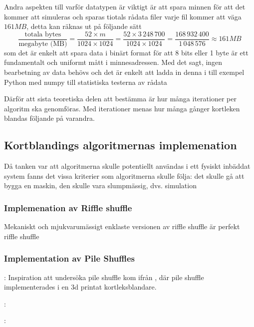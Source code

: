 \documentclass[swedish,a4paper]{article}
\begin{document}
Andra aspekten till varför datatypen är viktigt är att spara minnen för att det
kommer att simuleras och sparas tiotals rådata filer varje fil kommer att väga
$161 MB$,
detta kan räknas ut på följande sätt
$$ \frac{\text{totala bytes}}{\text{megabyte (MB)}} = \frac{52 \times m }{1024 \times
1024} = \frac{52 \times 3\,248\,700}{1024 \times 1024} = \frac{168\,932\,400}{1\,048\,576} \approx 161 MB 
$$
som det är enkelt att spara data i binärt format för att 8 bits eller 1 byte
är ett fundamentalt och uniformt mått i minnesadressen. Med det sagt, ingen
bearbetning av data behövs och det är enkelt att ladda in denna i till exempel Python
med numpy till statistiska testerna av rådata

Därför att sista teoretiska delen att bestämma
är hur många iterationer per algoritm ska genomföras. Med iterationer menas
hur många gånger kortleken blandas följande på varandra.

\subsection{Kortblandings algoritmernas implemenation}

Då tanken var att  algoritmerna skulle potentiellt användas i ett fysiskt
inbäddat system fanns det vissa  kriterier som algoritmerna skulle följa: det
skulle gå att bygga en maskin, den skulle vara slumpmässig, dvs. simulation

\subsubsection{Implemenation av Riffle shuffle}
Mekaniskt och mjukvarumässigt enklaste versionen av riffle shuffle är perfekt riffle shuffle

\subsubsection{Implementation av Pile Shuffles}
% 

: Inspiration att undersöka pile shuffle kom ifrån
\textcite{3DprintedLife2021},
där pile shuffle implementerades i en 3d printat kortleksblandare.  

: 


: 
\end{document}
